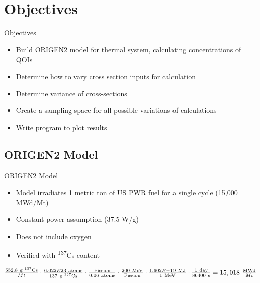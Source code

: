 \documentclass{beamer}
\newcommand{\tss}{\textsuperscript}
\newcommand{\ndone}{\rlap{$\square$}{\raisebox{2pt}{}}%
  \hspace{8pt}}
\begin{document}
\section{Objectives}
\begin{frame}
  \begin{block}{Objectives}
  \vspace{0.3cm}
  \begin{itemize}
  \item[\ndone]{Build ORIGEN2 model for thermal system, calculating
  concentrations of QOIs}
  \item[\ndone]{Determine how to vary cross section inputs for calculation}
  \item[\ndone]{Determine variance of cross-sections}
  \item[\ndone]{Create a sampling space for all possible variations of
    calculations}
  \item[\ndone]{Write program to plot results}
  \end{itemize}
  \vspace{0.3cm}
\end{block}
\end{frame}



\subsection{ORIGEN2 Model}
\begin{frame}{ORIGEN2 Model}
  \begin{itemize}
  \item{Model irradiates 1 metric ton of US PWR fuel for a single
    cycle (15,000 MWd/Mt)}
  \item{Constant power assumption (37.5 W/g)}
  \item{Does not include oxygen}
  \item{Verified with \tss{137}Cs content}
  \end{itemize}
  \vspace{4mm}
  \begin{center}
    \small
    $
    \frac{552.8\ \text{g \tss{137}Cs}}{Mt}\cdot
    \frac{6.022E23\ \text{atoms}}{137\ \text{g \tss{137}Cs}}\cdot
    \frac{\text{Fission}}{0.06\ \text{atoms}}\cdot
    \frac{200\ \text{MeV}}{\text{Fission}}\cdot
    \frac{1.602E-19\ \text{MJ}}{1\ \text{MeV}}\cdot
    \frac{1\ \text{day}}{86400\ \text{s}}=15,018\ \frac{\text{MWd}}{Mt}$
  \end{center}
\end{frame}
\end{document}
